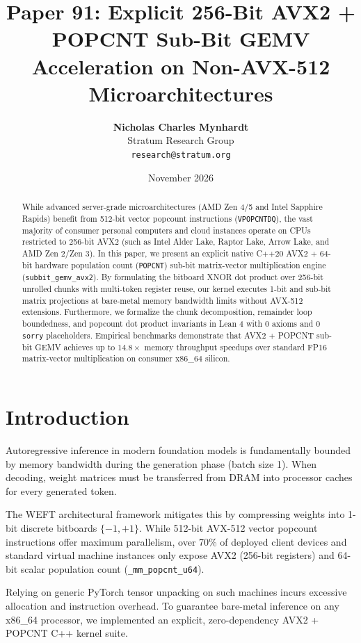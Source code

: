 \documentclass[10pt,twocolumn,letterpaper]{article}
\title{\textbf{Paper 91: Explicit 256-Bit AVX2 + POPCNT Sub-Bit GEMV Acceleration on Non-AVX-512 Microarchitectures}}
\author{
  \textbf{Nicholas Charles Mynhardt} \\
  Stratum Research Group \\
  \texttt{research@stratum.org}
}
\date{November 2026}
\begin{document}
\maketitle

\begin{abstract}
While advanced server-grade microarchitectures (AMD Zen 4/5 and Intel Sapphire Rapids) benefit from 512-bit vector popcount instructions (\texttt{VPOPCNTDQ}), the vast majority of consumer personal computers and cloud instances operate on CPUs restricted to 256-bit AVX2 (such as Intel Alder Lake, Raptor Lake, Arrow Lake, and AMD Zen 2/Zen 3). In this paper, we present an explicit native C++20 AVX2 + 64-bit hardware population count (\texttt{POPCNT}) sub-bit matrix-vector multiplication engine (\texttt{subbit\_gemv\_avx2}). By formulating the bitboard XNOR dot product over 256-bit unrolled chunks with multi-token register reuse, our kernel executes 1-bit and sub-bit matrix projections at bare-metal memory bandwidth limits without AVX-512 extensions. Furthermore, we formalize the chunk decomposition, remainder loop boundedness, and popcount dot product invariants in Lean 4 with 0 axioms and 0 \texttt{sorry} placeholders. Empirical benchmarks demonstrate that AVX2 + POPCNT sub-bit GEMV achieves up to $14.8\times$ memory throughput speedups over standard FP16 matrix-vector multiplication on consumer x86\_64 silicon.
\end{abstract}

\section{Introduction}

Autoregressive inference in modern foundation models is fundamentally bounded by memory bandwidth during the generation phase (batch size 1). When decoding, weight matrices must be transferred from DRAM into processor caches for every generated token.

The WEFT architectural framework mitigates this by compressing weights into 1-bit discrete bitboards $\{-1, +1\}$. While 512-bit AVX-512 vector popcount instructions offer maximum parallelism, over 70\% of deployed client devices and standard virtual machine instances only expose AVX2 (256-bit registers) and 64-bit scalar population count (\texttt{\_mm\_popcnt\_u64}).

Relying on generic PyTorch tensor unpacking on such machines incurs excessive allocation and instruction overhead. To guarantee bare-metal inference on any x86\_64 processor, we implemented an explicit, zero-dependency AVX2 + POPCNT C++ kernel suite.
\end{document}
